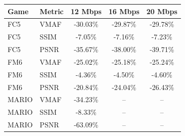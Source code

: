\begin{tabular}{llccc}
\toprule
Game & Metric & 12 Mbps & 16 Mbps & 20 Mbps \\
\midrule
FC5 & VMAF & -30.03\% & -29.87\% & -29.78\% \\
FC5 & SSIM & -7.05\% & -7.16\% & -7.23\% \\
FC5 & PSNR & -35.67\% & -38.00\% & -39.71\% \\
\midrule
FM6 & VMAF & -25.02\% & -25.18\% & -25.24\% \\
FM6 & SSIM & -4.36\% & -4.50\% & -4.60\% \\
FM6 & PSNR & -20.84\% & -24.04\% & -26.43\% \\
\midrule
MARIO & VMAF & -34.23\% & -- & -- \\
MARIO & SSIM & -8.33\% & -- & -- \\
MARIO & PSNR & -63.09\% & -- & -- \\
\bottomrule
\end{tabular}
